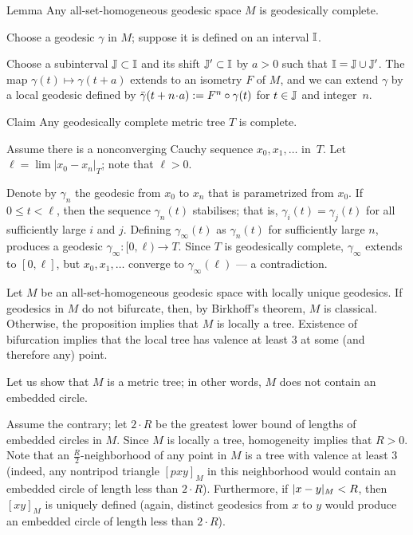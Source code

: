 \documentclass[leqno,a4paper,10pt]{article}
\begin{document}
\begin{thm}{Lemma}
Any all-set-homogeneous geodesic space $M$ is geodesically complete.
\end{thm}

Choose a geodesic $\gamma$ in $M$; suppose it is defined on an interval $\mathbb{I}$.

Choose a subinterval $\mathbb{J}\subset \mathbb{I}$ and its shift $\mathbb{J}'\subset \mathbb{I}$ by $a>0$ such that $\mathbb{I}=\mathbb{J}\cup\mathbb{J}'$.
The map $\gamma(t)\mapsto \gamma(t+a)$ extends to an isometry $F $ of $M$,
and we can extend $\gamma$ by a local geodesic defined by $\bar\gamma(t+n\cdot a)\df F^n\circ \gamma(t)$
for $t\in \mathbb{J}$ and integer~$n$.
\qeds

\begin{thm}{Claim}
Any geodesically complete metric tree $T$ is complete.
\end{thm}

Assume there is a nonconverging Cauchy sequence $x_0,x_1,\ldots$ in~$T$.
Let $\ell=\lim |x_0-x_n|_T$; note that $\ell>0$.

Denote by $\gamma_n$ the geodesic from $x_0$ to $x_n$ that is parametrized from $x_0$.
If $0\le t<\ell$, then the sequence $\gamma_n(t)$ stabilises; that is, $\gamma_i(t)=\gamma_j(t)$ for all sufficiently large $i$ and $j$.
Defining $\gamma_\infty(t)$ as $\gamma_n(t)$ for sufficiently large $n$, produces a geodesic $\gamma_\infty \colon[0,\ell)\to T$.
Since $T$ is geodesically complete, $\gamma_\infty$ extends to $[0,\ell]$, but $x_0,x_1,\dots$ converge to $\gamma_\infty(\ell)$ --- a contradiction.
\qeds

Let $M$ be an all-set-homogeneous geodesic space with locally unique geodesics.
If geodesics in $M$ do not bifurcate, then, by Birkhoff's theorem, $M$ is classical.
Otherwise, the proposition implies that $M$ is locally a tree.
Existence of bifurcation implies that the local tree has valence at least $3$ at some (and therefore any) point.

Let us show that $M$ is a metric tree; in other words, $M$ does not contain an embedded circle.

Assume the contrary; let $2\cdot R$ be the greatest lower bound of lengths of embedded circles in $M$.
Since $M$ is locally a tree, homogeneity implies that $R>0$.
Note that an $\tfrac R2$-neighborhood of any point in $M$ is a tree with valence at least $3$ (indeed, any nontripod triangle $[pxy]_M$ in this neighborhood would contain an embedded circle of length less than $2\cdot R$).
Furthermore, if $|x-y|_M\z<R$, then $[xy]_M$ is uniquely defined (again, distinct geodesics from $x$ to $y$ would produce an embedded circle of length less than $2\cdot R$).
\end{document}
